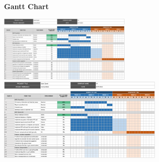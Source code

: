 \documentclass{article}
\begin{document}
\textbf{Gantt Chart}

    \begin{center}
        \includegraphics[height=120px, page=1]{mini-gantt-crop.pdf} \\
        \includegraphics[height=150px, page=2]{mini-gantt-crop.pdf}
    \end{center}
\end{document}
